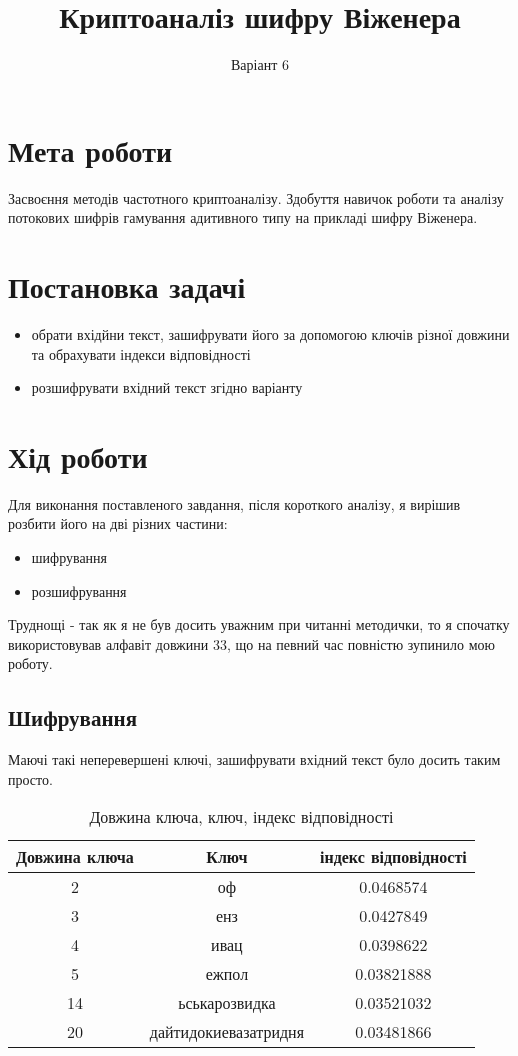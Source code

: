 \documentclass[12pt]{article}
\title{\textbf{Криптоаналіз шифру Віженера}}
\author{Варіант 6}
\date{}
\begin{document}
\maketitle
\section{Мета роботи}
\quad Засвоєння методів частотного криптоаналізу. Здобуття навичок роботи та аналізу потокових шифрів гамування адитивного типу на прикладі шифру Віженера.
    
\section{Постановка задачі}
\begin{itemize}
    \item обрати вхідйни текст, зашифрувати його за допомогою ключів різної довжини та обрахувати індекси відповідності
    \item розшифрувати вхідний текст згідно варіанту
\end{itemize}
    
\section{Хід роботи}
\quad Для виконання поставленого завдання, після короткого аналізу, я вирішив розбити його на дві різних частини: 
\begin{itemize}
    \item шифрування
    \item розшифрування
\end{itemize}
\quad Труднощі - так як я не був досить уважним при читанні методички, то я спочатку використовував алфавіт довжини 33, що на певний час повністю зупинило мою роботу.
    
\newpage
\subsection{Шифрування}
\quad Маючі такі неперевершені ключі, зашифрувати вхідний текст було досить таким просто.
\begin{table}[h]
\centering
\begin{tabular}{ccc}
\toprule
Довжина ключа & Ключ & індекс відповідності \\
\midrule
2 & оф & 0.0468574 \\
3 & енз & 0.0427849 \\
4 & ивац & 0.0398622 \\
5 & ежпол & 0.03821888 \\
14 & ьськарозвидка & 0.03521032 \\
20 & дайтидокиевазатридня & 0.03481866 \\
\bottomrule
\end{tabular}
\caption{Довжина ключа, ключ, індекс відповідності}
\label{tab:my_table}
\end{table}
    
\end{document}
